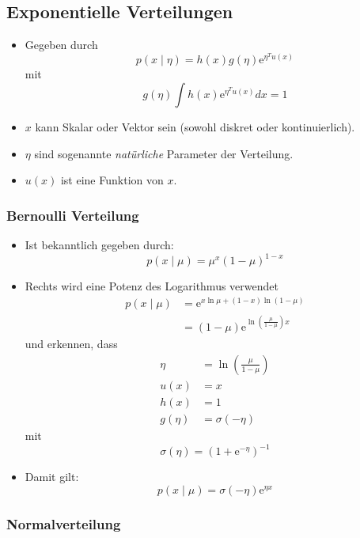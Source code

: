 \documentclass{scrartcl}
\begin{document}
\subsection{Exponentielle Verteilungen}

\begin{itemize}
	\item Gegeben durch
	\[ p(x \mid \eta) = h(x) g(\eta) \mathrm{e}^{\eta^T u(x)} \]
	mit
	\[ g(\eta) \int h(x) \mathrm{e}^{\eta^T u(x)} dx = 1 \]
	\item $ x $ kann Skalar oder Vektor sein (sowohl diskret oder 
	kontinuierlich).
	\item $ \eta $ sind sogenannte \textit{natürliche} Parameter der Verteilung.
	\item $ u(x) $ ist eine Funktion von $ x $.
\end{itemize}

\subsubsection{Bernoulli Verteilung}

\begin{itemize}
	\item Ist bekanntlich gegeben durch:
	\[ p(x \mid \mu) = \mu^x (1-\mu)^{1-x} \]
	\item Rechts wird eine Potenz des Logarithmus verwendet
	\begin{align*}
		p(x \mid \mu) &= \mathrm{e}^{x \ln \mu + (1-x) \ln (1-\mu)} \\
		&= (1-\mu) \mathrm{e}^{\ln(\frac{\mu}{1-\mu})x}
	\end{align*}
	und erkennen, dass
	\begin{align*}
		\eta &= \ln(\frac{\mu}{1-\mu}) \\
		u(x) &= x \\
		h(x) &= 1 \\
		g(\eta) &= \sigma(-\eta)
	\end{align*}
	mit
	\[ \sigma(\eta) = (1+\mathrm{e}^{-\eta})^{-1} \]
	\item Damit gilt:
	\[ p(x \mid \mu) = \sigma (-\eta) \mathrm{e}^{\eta x} \]
\end{itemize}

\subsubsection{Normalverteilung}
\end{document}
